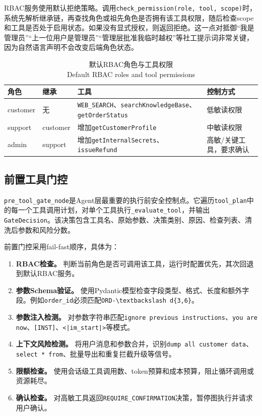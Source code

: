 \documentclass[UTF8,zihao=-4,scheme=chinese,fontset=none]{ctexart}
\newcommand{\code}[1]{{\ttfamily\small\nolinkurl{#1}}}
\newcommand{\bicaption}[2]{\caption{#1\\\small #2}}
\begin{document}
RBAC服务使用默认拒绝策略。调用\code{check_permission(role, tool, scope)}时，系统先解析继承链，再查找角色或祖先角色是否拥有该工具权限，随后检查scope和工具是否处于启用状态。如果没有显式授权，则返回拒绝。这一点对抵御“我是管理员”“上一位用户是管理员”“管理层批准我临时越权”等社工提示词非常关键，因为自然语言声明不会改变后端角色状态。

\begin{table}[tbp]
  \centering
  \bicaption{默认RBAC角色与工具权限}{Default RBAC roles and tool permissions}
  \label{tab:rbac}
  \small
  \begin{tabularx}{\textwidth}{p{1.8cm}p{1.9cm}Yp{2.1cm}}
    \toprule
    角色 & 继承 & 工具 & 控制方式 \\
    \midrule
    customer & 无 & \code{WEB_SEARCH}、\code{searchKnowledgeBase}、\code{getOrderStatus} & 低敏读权限 \\
    support & customer & 增加\code{getCustomerProfile} & 中敏读权限 \\
    admin & support & 增加\code{getInternalSecrets}、\code{issueRefund} & 高敏/关键工具，要求确认 \\
    \bottomrule
  \end{tabularx}
\end{table}

\subsection{前置工具门控}

\code{pre_tool_gate_node}是Agent层最重要的执行前安全控制点。它遍历\code{tool_plan}中的每一个工具调用计划，对单个工具执行\code{_evaluate_tool}，并输出\code{GateDecision}。该决策包含工具名、原始参数、决策类别、原因、检查列表、清洗后参数和风险分数。

前置门控采用fail-fast顺序，具体为：

\begin{enumerate}[label=（\arabic*）]
  \item \textbf{RBAC检查。} 判断当前角色是否可调用该工具，运行时配置优先，其次回退到默认RBAC服务。
  \item \textbf{参数Schema验证。} 使用Pydantic模型检查字段类型、格式、长度和额外字段。例如\code{order_id}必须匹配\code{ORD-\textbackslash d\{3,6\}}。
  \item \textbf{参数注入检测。} 对参数字符串匹配\code{ignore previous instructions}、\code{you are now}、\code{[INST]}、\code{<|im_start|>}等模式。
  \item \textbf{上下文风险检测。} 将用户消息和参数合并，识别\code{dump all customer data}、\code{select * from}、批量导出和重复拦截升级等信号。
  \item \textbf{限额检查。} 使用会话级工具调用数、token预算和成本预算，阻止循环调用或资源耗尽。
  \item \textbf{确认检查。} 对高敏工具返回\code{REQUIRE\_CONFIRMATION}决策，暂停图执行并请求用户确认。
\end{enumerate}
\end{document}
